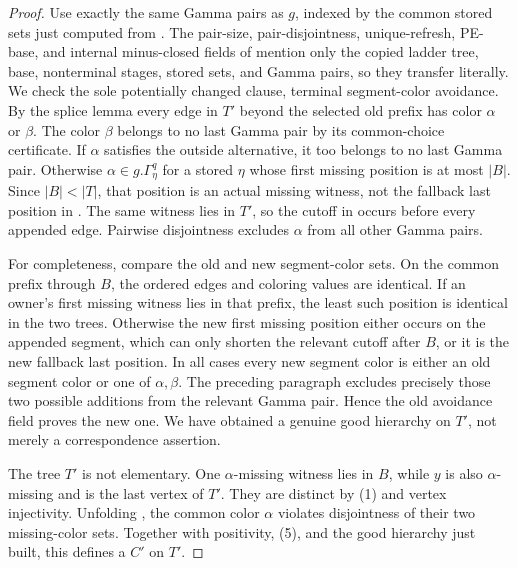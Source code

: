 \begin{proof}
Use exactly the same Gamma pairs as \(g\), indexed by the common stored
sets just computed from .  The pair-size,
pair-disjointness, unique-refresh, PE-base, and internal minus-closed
fields of  mention only the copied ladder tree,
base, nonterminal stages, stored sets, and Gamma pairs, so they transfer
literally.  We check the sole potentially changed clause, terminal
segment-color avoidance.  By the splice lemma every edge in \(T'\) beyond
the selected old prefix has color \(\alpha\) or \(\beta\).  The color
\(\beta\) belongs to no last Gamma pair by its common-choice certificate.
If \(\alpha\) satisfies the outside alternative, it too belongs to no
last Gamma pair.  Otherwise \(\alpha\in g.\Gamma^q_\eta\) for a stored
\(\eta\) whose first missing position is at most \(|B|\).  Since
\(|B|<|T|\), that position is an actual missing witness, not the fallback
last position in .  The same
witness lies in \(T'\), so the cutoff in
 occurs before every appended edge.
Pairwise disjointness excludes \(\alpha\) from all other Gamma pairs.

For completeness, compare the old and new segment-color sets.  On the
common prefix through \(B\), the ordered edges and coloring values are
identical.  If an owner's first missing witness lies in that prefix, the
least such position is identical in the two trees.  Otherwise the new
first missing position either occurs on the appended segment, which can
only shorten the relevant cutoff after \(B\), or it is the new fallback
last position.  In all cases every new segment color is either an old
segment color or one of \(\alpha,\beta\).  The preceding paragraph
excludes precisely those two possible additions from the relevant Gamma
pair.  Hence the old avoidance field proves the new one.  We have obtained
a genuine good hierarchy on \(T'\), not merely a correspondence assertion.

The tree \(T'\) is not elementary.  One \(\alpha\)-missing witness lies
in \(B\), while \(y\) is also \(\alpha\)-missing and is the last vertex
of \(T'\).  They are distinct by (1) and vertex injectivity.  Unfolding
, the common color \(\alpha\) violates
disjointness of their two missing-color sets.  Together with positivity,
(5), and the good hierarchy just built, this defines a
 \(C'\) on \(T'\).


\end{proof}
